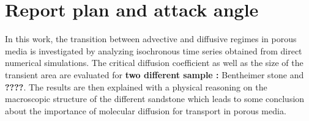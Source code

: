 \section{Report plan and attack angle}
In this work, the transition between advective and diffusive regimes in porous media is investigated by analyzing isochronous time series obtained from direct numerical simulations. 
The critical diffusion coefficient as well as the size of the transient area are evaluated for \textbf{two different sample :} Bentheimer stone and \textbf{????}.
The results are then explained with a physical reasoning on the macroscopic structure of the different sandstone which leads to some conclusion about the importance of molecular diffusion for transport in porous media.

